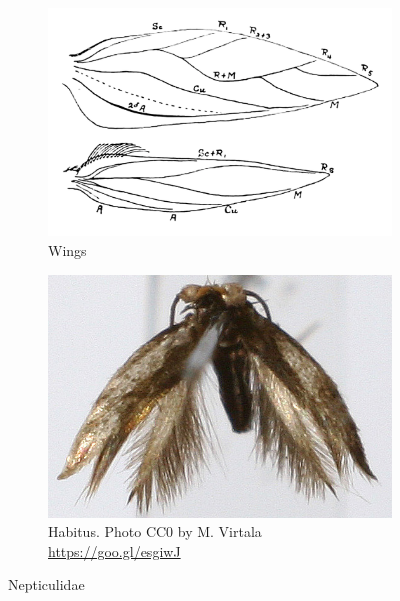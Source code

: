 \documentclass[letterpaper, 11pt]{article}
\begin{document}
\begin{figure}[ht!]
    \centering
    \begin{subfigure}[ht!]{0.42\textwidth}
        \includegraphics[width=\textwidth]{NepticulidWings}
        \caption{Wings \citep[][Fig. 1]{braun1917nepticulids}}
        \label{fig:nepticulid2}
    \end{subfigure}
    \hfill %
    \begin{subfigure}[ht!]{0.45\textwidth}
        \includegraphics[width=\textwidth]{nepticulid1}
        \caption{Habitus. Photo CC0 by M. Virtala \url{https://goo.gl/esgiwJ}}
        \label{fig:nepticulid1}
    \end{subfigure}
    \caption{Nepticulidae}\label{fig:nepticulids}
\end{figure}
\end{document}
